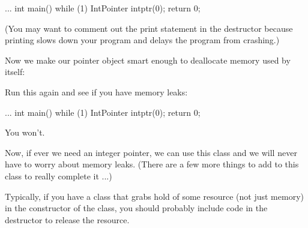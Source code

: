 \begin{consolethree}[escapeinside=||]
...
int main()
{
    while (1)
    {
        IntPointer intptr(0);
    }
    return 0;
}
\end{consolethree}

(You may want to comment out the print statement in the destructor
because printing slows down your program and delays the program from
crashing.)

Now we make our pointer object smart enough to deallocate memory used by
itself:

\begin{consolethree}[escapeinside=||]
...
class IntPointer
{
public:
    ...
    ~IntPointer()
    {
        delete p_;
    }
    ...
\end{consolethree}

Run this again and see if you have memory leaks:

\begin{consolethree}[escapeinside=||]
...
int main()
{
    while (1)
    {
        IntPointer intptr(0);
    }
    return 0;
}
\end{consolethree}

You won't.

Now, if ever we need an integer pointer, we can use this class and we
will never have to worry about memory leaks. (There are a few more
things to add to this class to really complete it ...)

Typically, if you have a class that grabs hold of some resource (not
just memory) in the constructor of the class, you should probably
include code in the destructor to release the resource.





